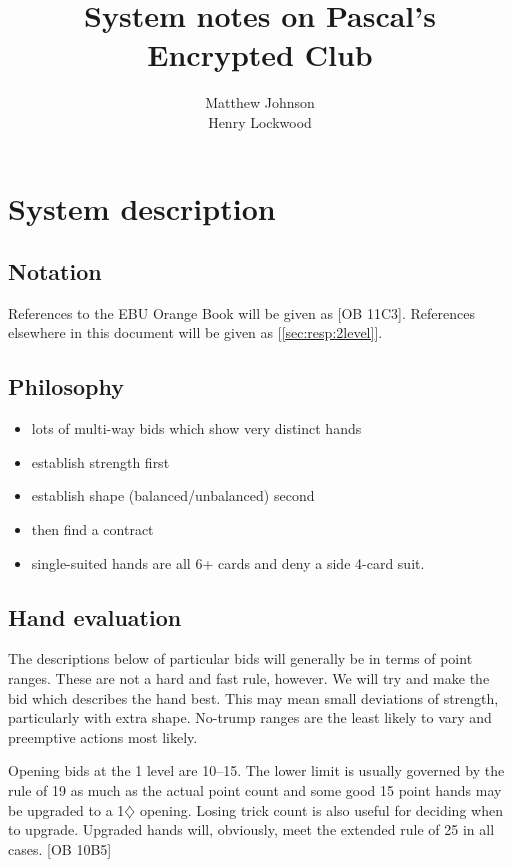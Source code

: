 \documentclass[a4paper,14pt]{extarticle}
\author{Matthew Johnson\\Henry Lockwood}
\title{System notes on Pascal's Encrypted Club}
\begin{document}
\newcommand{\orange}[1]{[OB #1]}
\newcommand{\xref}[1]{[\ref{#1}]}

\maketitle
\tableofcontents

\newpage

\section{System description}
\label{sec:system}

\subsection{Notation}
\label{sec:notation}

References to the EBU Orange Book will be given as \orange{11C3}. References
elsewhere in this document will be given as \xref{sec:resp:2level}.

\subsection{Philosophy}
\label{sec:philosophy}

\begin{itemize}
\item lots of multi-way bids which show very distinct hands
\item establish strength first
\item establish shape (balanced/unbalanced) second
\item then find a contract
\item single-suited hands are all 6+ cards and deny a side 4-card suit.
\end{itemize}

\subsection{Hand evaluation}

The descriptions below of particular bids will generally be in terms of point
ranges. These are not a hard and fast rule, however. We will try and make the
bid which describes the hand best. This may mean small deviations of strength, 
particularly with extra shape. No-trump ranges are the least likely to vary and
preemptive actions most likely.

Opening bids at the 1 level are 10--15. The lower limit is usually governed by
the rule of 19 as much as the actual point count and some good 15 point hands
may be upgraded to a 1$\diamondsuit$ opening. Losing trick count is also 
useful for deciding when to upgrade. Upgraded hands will, obviously, meet the
extended rule of 25 in all cases. \orange{10B5}
\end{document}
